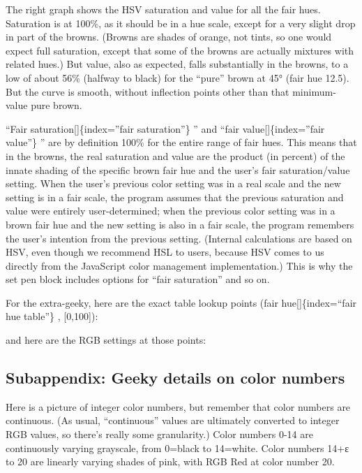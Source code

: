 \documentclass[
  letterpaper,
]{book}
\begin{document}
The right graph shows the HSV saturation and value for all the fair
hues. Saturation is at 100\%, as it should be in a hue scale, except for
a very slight drop in part of the browns. (Browns are shades of orange,
not tints, so one would expect full saturation, except that some of the
browns are actually mixtures with related hues.) But value, also as
expected, falls substantially in the browns, to a low of about 56\%
(halfway to black) for the ``pure'' brown at 45° (fair hue 12.5). But
the curve is smooth, without inflection points other than that
minimum-value pure brown.

``Fair saturation{[}{]}\{index=''fair saturation''\} '' and ``fair
value{[}{]}\{index=''fair value''\} '' are by definition 100\% for the
entire range of fair hues. This means that in the browns, the real
saturation and value are the product (in percent) of the innate shading
of the specific brown fair hue and the user's fair saturation/value
setting. When the user's previous color setting was in a real scale and
the new setting is in a fair scale, the program assumes that the
previous saturation and value were entirely user-determined; when the
previous color setting was in a brown fair hue and the new setting is
also in a fair scale, the program remembers the user's intention from
the previous setting. (Internal calculations are based on HSV, even
though we recommend HSL to users, because HSV comes to us directly from
the JavaScript color management implementation.) This is why the set pen
block includes options for ``fair saturation'' and so on.

For the extra-geeky, here are the exact table lookup points (fair
hue{[}{]}\{index=``fair hue table''\} , {[}0,100{]}):

and here are the RGB settings at those points:

\subsection{\texorpdfstring{ Subappendix: Geeky details on color
numbers}{ Subappendix: Geeky details on color numbers}}\label{subappendix-geeky-details-on-color-numbers}

Here is a picture of integer color numbers, but remember that color
numbers are continuous. (As usual, ``continuous'' values are ultimately
converted to integer RGB values, so there's really some granularity.)
Color numbers 0-14 are continuously varying grayscale, from 0=black to
14=white. Color numbers 14+ε to 20 are linearly varying shades of pink,
with RGB Red at color number 20.
\end{document}

